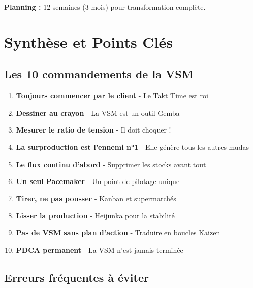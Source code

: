 \documentclass[12pt,a4paper]{article}
\begin{document}
\textbf{Planning :} 12 semaines (3 mois) pour transformation complète.

\newpage

\section{Synthèse et Points Clés}

\subsection{Les 10 commandements de la VSM}

\begin{enumerate}[leftmargin=*]
    \item \textbf{Toujours commencer par le client} - Le Takt Time est roi
    \item \textbf{Dessiner au crayon} - La VSM est un outil Gemba
    \item \textbf{Mesurer le ratio de tension} - Il doit choquer !
    \item \textbf{La surproduction est l'ennemi n°1} - Elle génère tous les autres mudas
    \item \textbf{Le flux continu d'abord} - Supprimer les stocks avant tout
    \item \textbf{Un seul Pacemaker} - Un point de pilotage unique
    \item \textbf{Tirer, ne pas pousser} - Kanban et supermarchés
    \item \textbf{Lisser la production} - Heijunka pour la stabilité
    \item \textbf{Pas de VSM sans plan d'action} - Traduire en boucles Kaizen
    \item \textbf{PDCA permanent} - La VSM n'est jamais terminée
\end{enumerate}

\subsection{Erreurs fréquentes à éviter}
\end{document}
